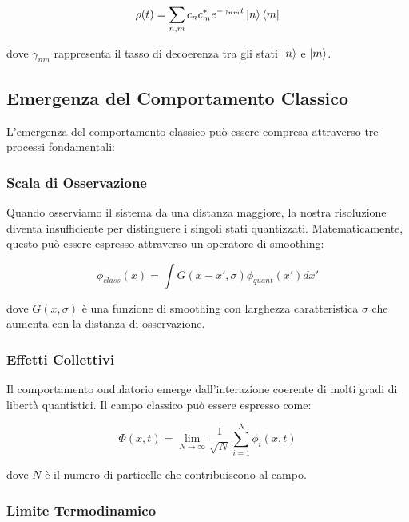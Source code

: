 \documentclass[a4paper,11pt]{article}
\begin{document}
\begin{equation}
\rho(t) = \sum_{n,m} c_n c_m^* e^{-\gamma_{nm}t} \ket{n}\bra{m}
\end{equation}


dove $\gamma_{nm}$ rappresenta il tasso di decoerenza tra gli stati
$\ket{n}$ e $\ket{m}$.

\subsection{Emergenza del Comportamento Classico}

L'emergenza del comportamento classico può essere compresa attraverso
tre processi fondamentali:

\subsubsection{Scala di Osservazione}

Quando osserviamo il sistema da una distanza maggiore, la nostra
risoluzione diventa insufficiente per distinguere i singoli stati
quantizzati. Matematicamente, questo può essere espresso attraverso un
operatore di smoothing:

\begin{equation}
\phi_{class}(x) = \int G(x-x', \sigma) \phi_{quant}(x') dx'
\end{equation}


dove $G(x,\sigma)$ è una funzione di smoothing con larghezza
caratteristica $\sigma$ che aumenta con la distanza di osservazione.

\subsubsection{Effetti Collettivi}

Il comportamento ondulatorio emerge dall'interazione coerente di molti
gradi di libertà quantistici. Il campo classico può essere espresso
come:

\begin{equation}
\Phi(x,t) = \lim_{N \to \infty} \frac{1}{\sqrt{N}} \sum_{i=1}^N \phi_i(x,t)
\end{equation}


dove $N$ è il numero di particelle che contribuiscono al campo.

\subsubsection{Limite Termodinamico}
\end{document}
